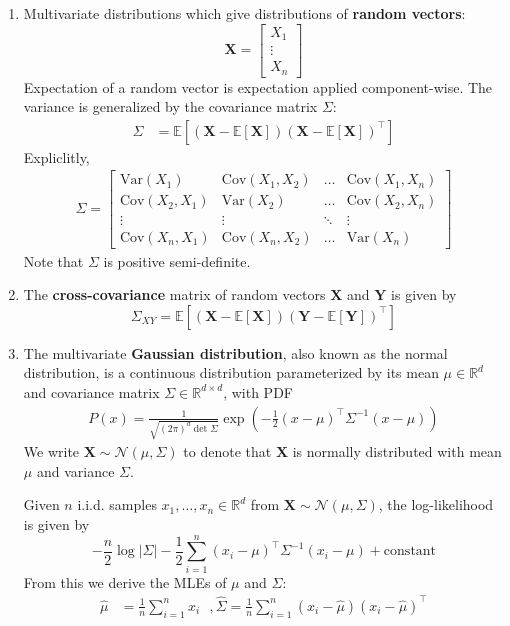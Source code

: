 \documentclass[10pt]{article}
\begin{document}
\begin{multicols}{2}
\begin{addmargin}[0.8em]{0.5em}
\begin{enumerate}[label=(\alph*)]
    \item Multivariate distributions which give distributions of \textbf{random vectors}:
    $$
    \mathbf{X} = \begin{bmatrix} X_1 \\ \vdots \\ X_n \end{bmatrix} 
    $$
    Expectation of a random vector is expectation applied component-wise. The variance is generalized by the covariance matrix $\Sigma$:
    \begin{align*}
    \Sigma &= \mathbb{E}[(\mathbf{X} - \mathbb{E}[\mathbf{X}])(\mathbf{X} - \mathbb{E}[\mathbf{X}])^\top]
    \end{align*}
    Expliclitly, 
    \begin{align*}
    \Sigma = 
    \begin{bmatrix}
    \text{Var}(X_1) & \text{Cov}(X_1, X_2) & \hdots & \text{Cov}(X_1, X_n) \\
    \text{Cov}(X_2, X_1) & \text{Var}(X_2) & \hdots & \text{Cov}(X_2, X_n) \\
    \vdots & \vdots & \ddots & \vdots \\
    \text{Cov}(X_n, X_1) & \text{Cov}(X_n, X_2) & \hdots & \text{Var}(X_n)
    \end{bmatrix}
    \end{align*}
    Note that $\Sigma$ is positive semi-definite.
    
    \item The \textbf{cross-covariance} matrix of random vectors $\mathbf{X}$ and $\mathbf{Y}$ is given by
    $$
    \Sigma_{XY} = \mathbb{E}[(\mathbf{X} - \mathbb{E}[\mathbf{X}])(\mathbf{Y} - \mathbb{E}[\mathbf{Y}])^\top]
    $$
    
    \item The multivariate \textbf{Gaussian distribution}, also known as the normal distribution, is a continuous distribution parameterized by its mean $\mu \in \mathbb{R}^d$ and covariance matrix $\Sigma \in \mathbb{R}^{d \times d}$, with PDF
    \begin{align*}
    P(x) = \frac{1}{\sqrt{(2\pi)^d \det{\Sigma}}} \exp \left( -\frac{1}{2} (x-\mu)^\top \Sigma^{-1} (x-\mu) \right)
    \end{align*}
    We write $\mathbf{X} \sim \mathcal{N}(\mu, \Sigma)$ to denote that $\mathbf{X}$ is normally distributed with mean $\mu$ and variance $\Sigma$.
    
    Given $n$ i.i.d. samples $x_1, \ldots, x_n \in \mathbb{R}^d$ from $\mathbf{X} \sim \mathcal{N}(\mu, \Sigma)$, the log-likelihood is given by
    $$
    -\frac{n}{2} \log{|\Sigma|} -\frac{1}{2} \sum_{i=1}^{n} (x_i - \mu)^\top \Sigma^{-1} (x_i - \mu) + \text{constant}
    $$
    From this we derive the MLEs of $\mu$ and $\Sigma$:
    \begin{align*}
    \hat{\mu} &= \frac{1}{n} \sum_{i=1}^{n} x_i \hspace{8pt}, \hat{\Sigma} = \frac{1}{n} \sum_{i=1}^{n} (x_i - \hat{\mu}) (x_i - \hat{\mu})^\top
    \end{align*}
    

\end{enumerate}
\end{addmargin}
\end{multicols}
\end{document}
